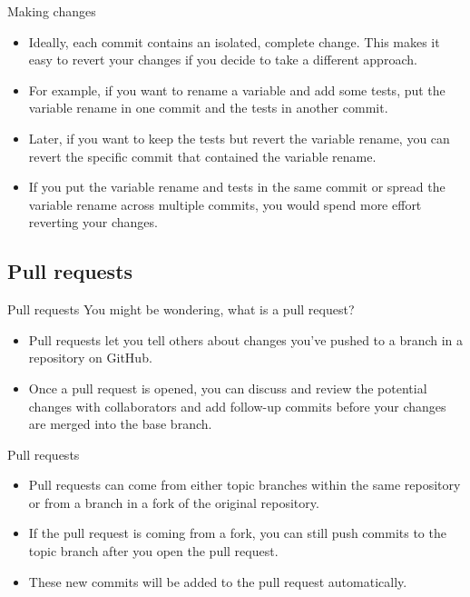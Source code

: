 \documentclass{beamer}
\begin{document}
\begin{frame}{Making changes}
    \begin{itemize}
        \item Ideally, each commit contains an isolated, complete change. This makes it easy to revert your changes if you decide to take a different approach.
        \item For example, if you want to rename a variable and add some tests, put the variable rename in one commit and the tests in another commit.
        \item Later, if you want to keep the tests but revert the variable rename, you can revert the specific commit that contained the variable rename.
        \item If you put the variable rename and tests in the same commit or spread the variable rename across multiple commits, you would spend more effort reverting your changes.
    \end{itemize}
\end{frame}

\subsection{Pull requests}

\begin{frame}{Pull requests}
    You might be wondering, what is a pull request?
    \begin{itemize}
        \item Pull requests let you tell others about changes you've pushed to a branch in a repository on GitHub.
        \item Once a pull request is opened, you can discuss and review the potential changes with collaborators and add follow-up commits before your changes are merged into the base branch.
    \end{itemize}
\end{frame}

\begin{frame}{Pull requests}
    \begin{itemize}
        \item Pull requests can come from either topic branches within the same repository or from a branch in a fork of the original repository.
        \item If the pull request is coming from a fork, you can still push commits to the topic branch after you open the pull request.
        \item These new commits will be added to the pull request automatically.
    \end{itemize}
\end{frame}
\end{document}
